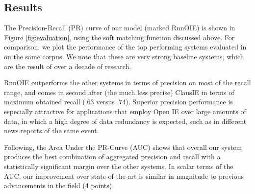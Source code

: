 \subsection{Results}










The Precision-Recall (PR) curve of our model (marked RnnOIE) is shown in Figure \ref{fig:evaluation},
using the soft matching function discussed above.
For comparison, we plot the performance of the top performing systems evaluated in \cite{Stanovsky2016EMNLP} on the same corpus. We note that these are very strong baseline systems, which are the result of over a decade of research.

RnnOIE outperforms the other systems in terms of precision on most of the recall range, and comes in second after (the much less precise) ClausIE in terms of maximum obtained recall (.63 versus .74).
Superior precision performance is especially attractive for
applications that employ Open IE over large amounts of data, in which a high degree of data redundancy is expected, such as in different news reports of the same event.

Following, the Area Under the PR-Curve (AUC) shows that overall our system
produces the best combination of aggregated precision and recall with a statistically significant margin over
the other systems. In scalar terms of the AUC, our improvement over state-of-the-art is similar in magnitude to previous
advancements in the field (4 points).






